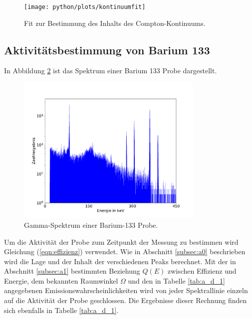 \begin{figure}
  \texttt{[image: python/plots/kontinuumfit]}
  \caption{Fit zur Bestimmung des Inhalts des Compton-Kontinuums.}
  \label{fig:kontinuumplot}
\end{figure}

\FloatBarrier
\subsection{Aktivitätsbestimmung von Barium 133}
\label{subsec:a3}
In Abbildung \ref{fig:Spektrum_Barium} ist das Spektrum einer Barium 133 Probe dargestellt.
\begin{figure}
\centering
\includegraphics[width=0.8\textwidth]{python/plots/spec3.pdf}
\caption{Gamma-Spektrum einer Barium-133 Probe.}
\label{fig:Spektrum_Barium}
\end{figure}
Um die Aktivität der Probe zum Zeitpunkt der Messung zu bestimmen wird Gleichung (\ref{eqn:effizienz}) verwendet.
Wie in Abschnitt \ref{subsec:a0} beschrieben wird die Lage und der Inhalt der verschiedenen Peaks berechnet.
Mit der in Abschnitt \ref{subsec:a1} bestimmten Beziehung $Q(E)$ zwischen Effizienz und Energie, dem bekannten Raumwinkel $\Omega$ und den in Tabelle \ref{tab:a_d_1} angegebenen Emissionswahrscheinlichkeiten wird von jeder Spektrallinie einzeln auf die Aktivität der Probe geschlossen.
Die Ergebnisse dieser Rechnung finden sich ebenfalls in Tabelle \ref{tab:a_d_1}.
